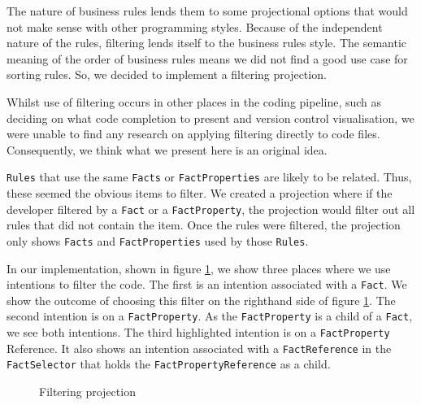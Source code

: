The nature of business rules lends them to some projectional options that would not make sense with other programming styles.
Because of the independent nature of the rules, filtering lends itself to the business rules style.
The semantic meaning of the order of business rules means we did not find a good use case for sorting rules.
So, we decided to implement a filtering projection.

Whilst use of filtering occurs in other places in the coding pipeline, such as deciding on what code completion to present\cite{hou2010towards} and version control visualisation\cite{yoon2013visualization}, we were unable to find any research on applying filtering directly to code files.
Consequently, we think what we present here is an original idea.

\texttt{Rules} that use the same \texttt{Facts} or \texttt{FactProperties} are likely to be related.
Thus, these seemed the obvious items to filter.
We created a projection where if the developer filtered by a \texttt{Fact} or a \texttt{FactProperty}, the projection would filter out all rules that did not contain the item.
Once the rules were filtered, the projection only shows \texttt{Facts} and \texttt{FactProperties} used by those \texttt{Rules}.

In our implementation, shown in figure \ref{fig:filteringProjection}, we show three places where we use intentions to filter the code.
The first is an intention associated with a \texttt{Fact}.
We show the outcome of choosing this filter on the righthand side of figure \ref{fig:filteringProjection}.
The second intention is on a \texttt{FactProperty}.
As the \texttt{FactProperty} is a child of a \texttt{Fact}, we see both intentions.
The third highlighted intention is on a \texttt{FactProperty} Reference.
It also shows an intention associated with a \texttt{FactReference} in the \texttt{FactSelector} that holds the \texttt{FactPropertyReference} as a child.

\begin{figure}
    \centering
    \caption{Filtering projection}
    \label{fig:filteringProjection}
\end{figure}

